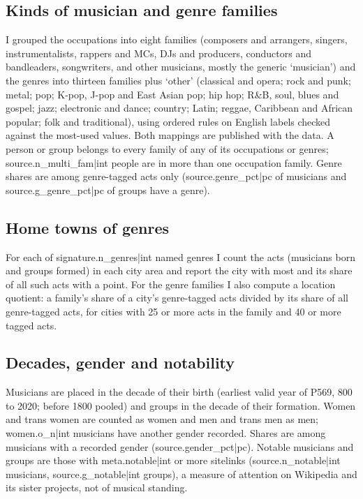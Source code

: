 \documentclass[11pt,a4paper]{article}
\begin{document}
\subsection{Kinds of musician and genre families}
I grouped the occupations into eight families (composers and arrangers, singers, instrumentalists, rappers and MCs, DJs and producers, conductors and bandleaders, songwriters, and other musicians, mostly the generic `musician') and the genres into thirteen families plus `other' (classical and opera; rock and punk; metal; pop; K-pop, J-pop and East Asian pop; hip hop; R\&B, soul, blues and gospel; jazz; electronic and dance; country; Latin; reggae, Caribbean and African popular; folk and traditional), using ordered rules on English labels checked against the most-used values. Both mappings are published with the data. A person or group belongs to every family of any of its occupations or genres; {{source.n_multi_fam|int}} people are in more than one occupation family. Genre shares are among genre-tagged acts only ({{source.genre_pct|pc}} of musicians and {{source.g_genre_pct|pc}} of groups have a genre).

\subsection{Home towns of genres}
For each of {{signature.n_genres|int}} named genres I count the acts (musicians born and groups formed) in each city area and report the city with most and its share of all such acts with a point. For the genre families I also compute a location quotient: a family's share of a city's genre-tagged acts divided by its share of all genre-tagged acts, for cities with 25 or more acts in the family and 40 or more tagged acts.

\subsection{Decades, gender and notability}
Musicians are placed in the decade of their birth (earliest valid year of P569, 800 to 2020; before 1800 pooled) and groups in the decade of their formation. Women and trans women are counted as women and men and trans men as men; {{women.o_n|int}} musicians have another gender recorded. Shares are among musicians with a recorded gender ({{source.gender_pct|pc}}). Notable musicians and groups are those with {{meta.notable|int}} or more sitelinks ({{source.n_notable|int}} musicians, {{source.g_notable|int}} groups), a measure of attention on Wikipedia and its sister projects, not of musical standing.
\end{document}
